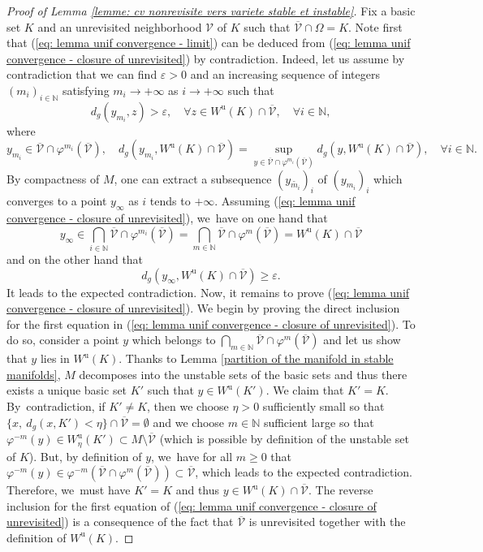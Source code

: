 \documentclass[11pt]{article}
\newcommand{\ru}{\mathrm{u}}
\theoremstyle{definition}
\theoremstyle{plain}
\newcommand{\N}{\mathbb{N}}
\newcommand{\Vcal}{\mathcal{V}}
\begin{document}
\begin{proof}[Proof of Lemma \ref{lemme: cv nonrevisite vers variete stable et instable}]
Fix a basic set $K$ and an unrevisited neighborhood $\Vcal$ of $K$ such that $\overline{\Vcal} \cap \Omega = K$. Note first that (\ref{eq: lemma unif convergence - limit}) can be deduced from (\ref{eq: lemma unif convergence - closure of unrevisited}) by contradiction. Indeed, let us assume by contradiction that we can find $\varepsilon > 0$ and an increasing sequence of integers $(m_i)_{i \in \N}$ satisfying $m_i \to +\infty$ as $i \to +\infty$ such that
\[
d_g (y_{m_i},z) > \varepsilon, \quad \forall z \in W^\ru (K) \cap \overline{\Vcal}, \quad \forall i \in \N,
\]
where
\[
y_{m_i} \in \overline{\Vcal} \cap \varphi^{m_i} (\overline{\Vcal}), \quad d_g (y_{m_i},W^{\ru} (K) \cap \overline{\Vcal}) = \sup_{y \in \overline{\Vcal} \cap \varphi^{m_i} (\overline{\Vcal})} d_g \left(y, W^{\ru} (K) \cap \overline{\Vcal} \right), \quad \forall i \in \N.
\]
By compactness of $M$, one can extract a subsequence $(y_{\widetilde{m_i}})_i$ of $(y_{m_i})_i$ which converges to a point $y_{\infty}$ as $i$ tends to $+\infty$. Assuming (\ref{eq: lemma unif convergence - closure of unrevisited}), we~have on one hand that
\[
y_{\infty} \in \bigcap_{i \in \N} \overline{\Vcal} \cap \varphi^{m_i} (\overline{\Vcal}) = \bigcap_{m \in \N} \overline{\Vcal} \cap \varphi^{m} (\overline{\Vcal}) = W^\ru (K) \cap \overline{\Vcal}
\]
and on the other hand that
\[
d_g (y_{\infty}, W^\ru (K) \cap \overline{\Vcal}) \geq \varepsilon.
\]
It leads to the expected contradiction. Now, it remains to prove (\ref{eq: lemma unif convergence - closure of unrevisited}). We begin by proving the direct inclusion for the first equation in (\ref{eq: lemma unif convergence - closure of unrevisited}). To do so, consider a point $y$ which belongs to $\bigcap_{m \in \N} \overline{\Vcal} \cap \varphi^m (\overline{\Vcal})$ and let us show that $y$ lies in $W^\ru (K)$. Thanks to Lemma \ref{partition of the manifold in stable manifolds}, $M$ decomposes into the unstable sets of the basic sets and thus there exists a unique basic set $K'$ such that $ y \in W^\ru (K')$. We claim that $K' = K$. By~contradiction, if $K' \neq K$, then we choose $\eta > 0$ sufficiently small so that $\{x, \: d_g(x,K') < \eta\} \cap \overline{\Vcal} = \emptyset$ and we choose $m \in \N$ sufficient large so that $\varphi^{-m} (y) \in W_{\eta}^\ru (K') \subset M \setminus \overline{\Vcal}$ (which is possible by definition of the unstable set of $K$). But, by definition of $y$, we~have for all $m \geq 0$ that $\varphi^{-m} (y) \in \varphi^{-m} (\overline{\Vcal} \cap \varphi^m (\overline{\Vcal})) \subset \overline{\Vcal}$, which leads to the expected contradiction. Therefore, we~must have $K' = K$ and thus $y \in W^\ru (K) \cap \overline{\Vcal}$. The reverse inclusion for the first equation of (\ref{eq: lemma unif convergence - closure of unrevisited}) is a consequence of the fact that $\overline{\Vcal}$ is unrevisited together with the definition of $W^\ru (K)$.


\end{proof}
\end{document}
